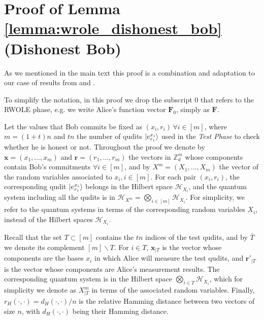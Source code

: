 
\appendix

\chapter{Proof of Lemma \ref{lemma:wrole_dishonest_bob} (Dishonest Bob)}
\label{app:proofBobdishonest}

As we mentioned in the main text this proof is  a combination and adaptation to our case of results from \cite{DFLSS09} and \cite{Dupuis2015}. 

To simplify the notation, in this proof we drop the subscript $0$ that refers to the RWOLE phase, e.g. we write Alice's function vector  $\mathbf{F}_0$,  simply  as $\mathbf{F}$. 


Let the values that Bob commits be fixed as  $(x_i, r_i)\, \forall i\in[m]$, where $m = (1+t)n$ and $t n$  the number of qudits $| e^{x_i}_{r_i} \rangle$ used in the \textit{Test Phase} to check whether he is honest or not. Throughout the proof we denote by $\boldsymbol{x} = (x_1, \ldots, x_m)$ and $\boldsymbol{r} = (r_1, \ldots, r_m)$ the vectors in $\mathbb{Z}_d^m$ whose components contain Bob's commitments $\forall i\in [m]$, and by $X^m=(X_1,\ldots,X_m)$ the vector of the  random variables associated to  $x_i, i\in [m]$. For each  pair $(x_i, r_i)$, the corresponding qudit $| e^{x_i}_{r_i} \rangle$ belongs in the Hilbert space $\mathcal{H}_{X_i}$, and the quantum system including all the qudits is in $\mathcal{H}_{X^m}=\bigotimes_{i\in [m]}\mathcal{H}_{X_i}$. For simplicity, we refer to the quantum systems in terms of the corresponding  random variables  $X_i$, instead of the Hilbert spaces $\mathcal{H}_{X_i}$.


Recall that the set $T\subset[m]$ contains the $tn$ indices of the test qudits, and by $\bar{T}$ we denote its complement $[m]\backslash T$.  For  $i\in T$, $\boldsymbol{x}_{|T}$ is the vector whose components are the  bases $x_i$  in which Alice will measure the test qudits, and $ \boldsymbol{r'}_{|T}$ is the vector whose components are Alice's measurement results. The corresponding quantum system is in the Hilbert space $\bigotimes_{i\in T}\mathcal{H}_{X_i}$, which for simplicity we denote as $X^m_{|T}$ in terms of the associated random variables.   
Finally, $r_H(\cdot, \cdot)=d_H(\cdot, \cdot)/n$ is the relative Hamming distance between two  vectors of size $n$, with $d_H(\cdot, \cdot)$ being their Hamming distance.


